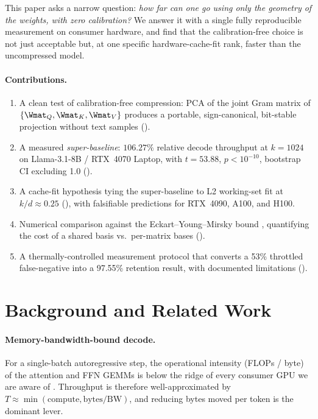 \documentclass[11pt]{article}
\begin{document}
This paper asks a narrow question: \emph{how far can one go using only the
geometry of the weights, with zero calibration?}  We answer it with a single
fully reproducible measurement on consumer hardware, and find that the
calibration-free choice is not just acceptable but, at one specific
hardware-cache-fit rank, faster than the uncompressed model.

\paragraph{Contributions.}
\begin{enumerate}
\item A clean test of calibration-free compression: PCA of the joint Gram
matrix of $\{\Wmat_Q,\Wmat_K,\Wmat_V\}$ produces a portable, sign-canonical,
bit-stable projection without text samples ().
\item A measured \emph{super-baseline}: $106.27\%$ relative decode throughput
at $k{=}1024$ on Llama-3.1-8B / RTX~4070 Laptop, with $t{=}53.88$,
$p<10^{-10}$, bootstrap CI excluding 1.0 ().
\item A cache-fit hypothesis tying the super-baseline to L2 working-set fit at
$k/d\!\approx\!0.25$ (), with falsifiable predictions for
RTX~4090, A100, and H100.
\item Numerical comparison against the Eckart--Young--Mirsky bound
\cite{eckart1936}, quantifying the cost of a shared basis vs.\ per-matrix
bases ().
\item A thermally-controlled measurement protocol that converts a 53\%
throttled false-negative into a 97.55\% retention result, with
documented limitations ().
\end{enumerate}

\section{Background and Related Work}
\label{sec:background}

\paragraph{Memory-bandwidth-bound decode.}
For a single-batch autoregressive step, the operational intensity (FLOPs /
byte) of the attention and FFN GEMMs is below the ridge of every consumer GPU
we are aware of \cite{yuan2024llmroofline,nvidia2022ada}.  Throughput is
therefore well-approximated by
$T \approx \min(\text{compute}, \text{bytes}/\text{BW})$, and reducing bytes
moved per token is the dominant lever.
\end{document}
